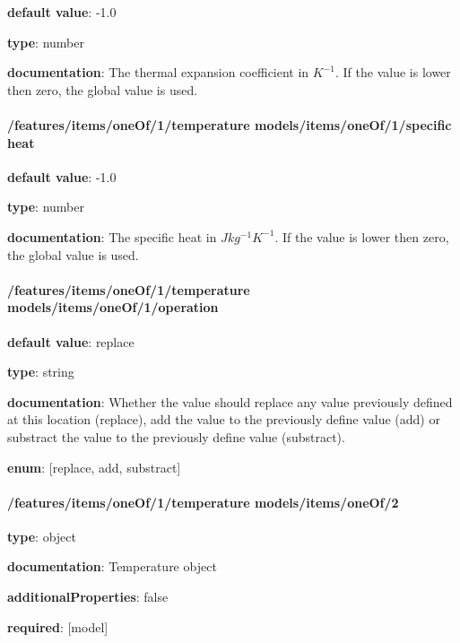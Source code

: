 \begin{itemized}
\item {\bf default value}: -1.0
\item {\bf type}: number
\item {\bf documentation}: The thermal expansion coefficient in $K^{-1}$. If the value is lower then zero, the global value is used.
\end{itemized}\paragraph{/features/items/oneOf/1/temperature models/items/oneOf/1/specific heat} \begin{itemized}
\item {\bf default value}: -1.0
\item {\bf type}: number
\item {\bf documentation}: The specific heat in $J kg^{-1} K^{-1}$. If the value is lower then zero, the global value is used.
\end{itemized}\paragraph{/features/items/oneOf/1/temperature models/items/oneOf/1/operation} \begin{itemized}
\item {\bf default value}: replace
\item {\bf type}: string
\item {\bf documentation}: Whether the value should replace any value previously defined at this location (replace), add the value to the previously define value (add) or substract the value to the previously define value (substract).
\item {\bf enum}: [replace, add, substract]\end{itemized}\paragraph{/features/items/oneOf/1/temperature models/items/oneOf/2} \begin{itemized}
\item {\bf type}: object
\item {\bf documentation}: Temperature object
\item {\bf additionalProperties}: false
\item {\bf required}: [model]\end{itemized}
